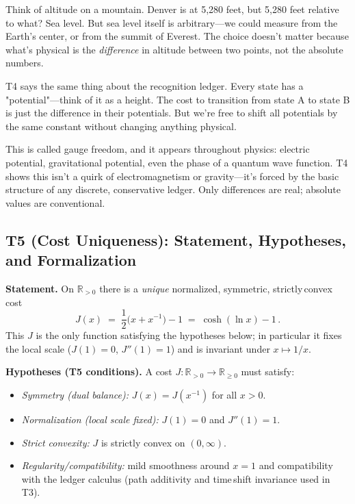 \documentclass[11pt]{article}
\begin{document}
\begin{explanationbox}
Think of altitude on a mountain. Denver is at 5,280 feet, but 5,280 feet relative to what? Sea level. But sea level itself is arbitrary—we could measure from the Earth's center, or from the summit of Everest. The choice doesn't matter because what's physical is the \textit{difference} in altitude between two points, not the absolute numbers.

T4 says the same thing about the recognition ledger. Every state has a "potential"—think of it as a height. The cost to transition from state A to state B is just the difference in their potentials. But we're free to shift all potentials by the same constant without changing anything physical.

This is called gauge freedom, and it appears throughout physics: electric potential, gravitational potential, even the phase of a quantum wave function. T4 shows this isn't a quirk of electromagnetism or gravity—it's forced by the basic structure of any discrete, conservative ledger. Only differences are real; absolute values are conventional.
\end{explanationbox}

\subsection*{T5 (Cost Uniqueness): Statement, Hypotheses, and Formalization}
\textbf{Statement.} On $\mathbb R_{>0}$ there is a \emph{unique} normalized, symmetric, strictly\,convex cost
\begin{equation*}
  J(x) \;=\; \frac12\bigl(x + x^{-1}\bigr) - 1 \;=\; \cosh(\ln x) - 1\,.
\end{equation*}
This $J$ is the only function satisfying the hypotheses below; in particular it fixes the local scale ($J(1)=0$, $J''(1)=1$) and is invariant under $x\mapsto 1/x$.

\medskip
\textbf{Hypotheses (T5 conditions).} A cost $J: \mathbb R_{>0}\to \mathbb R_{\ge 0}$ must satisfy:
\begin{itemize}[leftmargin=*]
  \item \emph{Symmetry (dual balance):} $J(x)=J(x^{-1})$ for all $x>0$.
  \item \emph{Normalization (local scale fixed):} $J(1)=0$ and $J''(1)=1$.
  \item \emph{Strict convexity:} $J$ is strictly convex on $(0,\infty)$.
  \item \emph{Regularity/compatibility:} mild smoothness around $x=1$ and compatibility with the ledger calculus (path additivity and time\,shift invariance used in T3).
\end{itemize}
\end{document}

